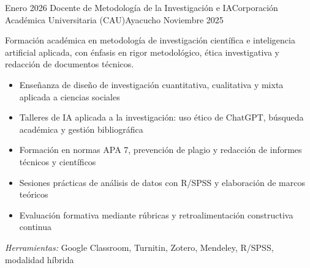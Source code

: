 \experience
{Enero 2026} {Docente de Metodología de la Investigación e IA}{Corporación Académica Universitaria (CAU)}{Ayacucho}
{Noviembre 2025} {
	Formación académica en metodología de investigación científica e inteligencia artificial aplicada, con énfasis en rigor metodológico, ética investigativa y redacción de documentos técnicos.
	\begin{itemize}
		\item Enseñanza de diseño de investigación cuantitativa, cualitativa y mixta aplicada a ciencias sociales
		\item Talleres de IA aplicada a la investigación: uso ético de ChatGPT, búsqueda académica y gestión bibliográfica
		\item Formación en normas APA 7, prevención de plagio y redacción de informes técnicos y científicos
		\item Sesiones prácticas de análisis de datos con R/SPSS y elaboración de marcos teóricos
		\item Evaluación formativa mediante rúbricas y retroalimentación constructiva continua
	\end{itemize}
}
{\footnotesize{\emph{Herramientas:} Google Classroom, Turnitin, Zotero, Mendeley, R/SPSS, modalidad híbrida}}
